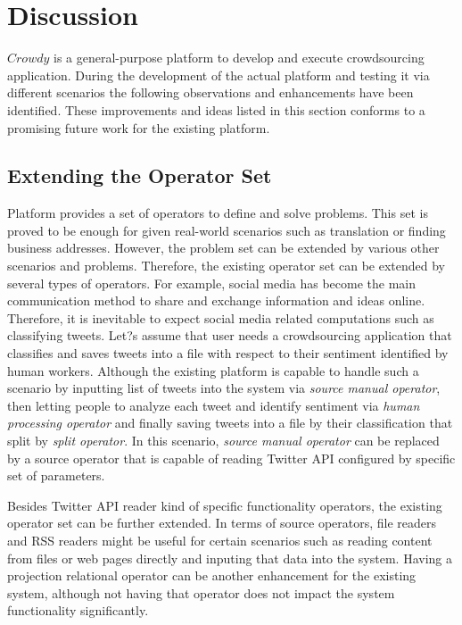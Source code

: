 \chapter{Discussion}
\label{chap:discussion}

$Crowdy$ is a general-purpose platform to develop and execute crowdsourcing application. During the development of the actual platform and testing it via different scenarios the following observations and enhancements have been identified. These improvements and ideas listed in this section conforms to a promising future work for the existing platform. 

\section{Extending the Operator Set}
Platform provides a set of operators to define and solve problems. This set is proved to be enough for given real-world scenarios such as translation or finding business addresses. However, the problem set can be extended by various other scenarios and problems. Therefore, the existing operator set can be extended by several types of operators. For example, social media has become the main communication method to share and exchange information and ideas online. Therefore, it is inevitable to expect social media related computations such as classifying tweets. Let?s assume that user needs a crowdsourcing application that classifies and saves tweets into a file with respect to their sentiment identified by human workers. Although the existing platform is capable to handle such a scenario by inputting list of tweets into the system via \textit{source manual operator}, then letting people to analyze each tweet and identify sentiment via \textit{human processing operator} and finally saving tweets into a file by their classification that split by \textit{split operator}. In this scenario, \textit{source manual operator} can be replaced by a source operator that is capable of reading Twitter API configured by specific set of parameters.

Besides Twitter API reader kind of specific functionality operators, the existing operator set can be further extended. In terms of source operators, file readers and RSS readers might be useful for certain scenarios such as reading content from files or web pages directly and inputing that data into the system. Having a projection relational operator can be another enhancement for the existing system, although not having that operator does not impact the system functionality significantly.

